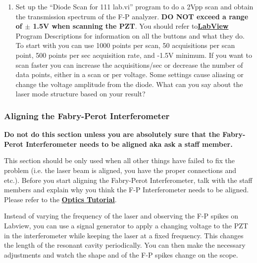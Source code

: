 \documentclass{../lab}
\begin{document}
\begin{enumerate}
    \item Set up the ``Diode Scan for 111 lab.vi'' program to do a 2Vpp scan and obtain the transmission spectrum of the F-P analyzer. \textbf{DO NOT exceed a range of $\pm$ 1.5V when scanning the PZT}. You should refer to\href{http://experimentationlab.berkeley.edu/node/119}{\textbf{}}\href{http://experimentationlab.berkeley.edu/node/119}{\textbf{LabView}} Program Descriptions for information on all the buttons and what they do. To start with you can use 1000 points per scan, 50 acquisitions per scan point, 500 points per sec acquisition rate, and -1.5V minimum. If you want to scan faster you can increase the acquisitions/sec or decrease the number of data points, either in a scan or per voltage. Some settings cause aliasing or change the voltage amplitude from the diode. What can you say about the laser mode structure based on your result?

\end{enumerate}

\subsubsection{Aligning the Fabry-Perot Interferometer}

\textbf{Do not do this section unless you are absolutely sure that the Fabry-Perot Interferometer needs to be aligned aka ask a staff member.}

This section should be only used when all other things have failed to fix the problem (i.e. the laser beam is aligned, you have the proper connections and etc.). Before you start aligning the Fabry-Perot Interferometer, talk with the staff members and explain why you think the F-P Interferometer needs to be aligned. Please refer to the \href{http://experimentationlab.berkeley.edu/OpticsTutorial}{\textbf{Optics Tutorial}}.

Instead of varying the frequency of the laser and observing the F-P spikes on Labview, you can use a signal generator to apply a changing voltage to the PZT in the interferometer while keeping the laser at a fixed frequency. This changes the length of the resonant cavity periodically. You can then make the necessary adjustments and watch the shape and of the F-P spikes change on the scope.

\newpage
\end{document}
